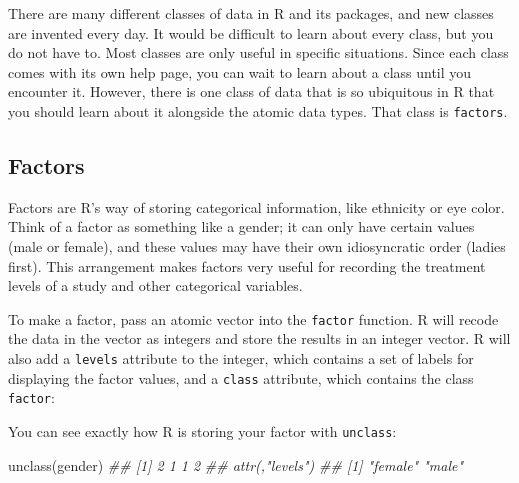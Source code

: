 \documentclass[
  letterpaper,
  DIV=11,
  numbers=noendperiod]{scrbook}
\newenvironment{Shaded}{\begin{snugshade}}{\end{snugshade}}
\newcommand{\DocumentationTok}[1]{\textcolor[rgb]{0.37,0.37,0.37}{\textit{#1}}}
\newcommand{\FunctionTok}[1]{\textcolor[rgb]{0.28,0.35,0.67}{#1}}
\newcommand{\NormalTok}[1]{\textcolor[rgb]{0.00,0.23,0.31}{#1}}
\newcommand{\OtherTok}[1]{\textcolor[rgb]{0.00,0.23,0.31}{#1}}
\newcommand{\StringTok}[1]{\textcolor[rgb]{0.13,0.47,0.30}{#1}}
\begin{document}
There are many different classes of data in R and its packages, and new
classes are invented every day. It would be difficult to learn about
every class, but you do not have to. Most classes are only useful in
specific situations. Since each class comes with its own help page, you
can wait to learn about a class until you encounter it. However, there
is one class of data that is so ubiquitous in R that you should learn
about it alongside the atomic data types. That class is
\texttt{factors}.

\subsection{Factors}\label{factors}

Factors are R's way of storing categorical information, like ethnicity
or eye color. Think of a factor as something like a gender; it can only
have certain values (male or female), and these values may have their
own idiosyncratic order (ladies first). This arrangement makes factors
very useful for recording the treatment levels of a study and other
categorical variables.

To make a factor, pass an atomic vector into the \texttt{factor}
function. R will recode the data in the vector as integers and store the
results in an integer vector. R will also add a \texttt{levels}
attribute to the integer, which contains a set of labels for displaying
the factor values, and a \texttt{class} attribute, which contains the
class \texttt{factor}:

\begin{Shaded}
\end{Shaded}

You can see exactly how R is storing your factor with \texttt{unclass}:

\begin{Shaded}
\begin{Highlighting}[]
\FunctionTok{unclass}\NormalTok{(gender)}
\DocumentationTok{\#\# [1] 2 1 1 2}
\DocumentationTok{\#\# attr(,"levels")}
\DocumentationTok{\#\# [1] "female" "male"  }
\end{Highlighting}
\end{Shaded}
\end{document}

